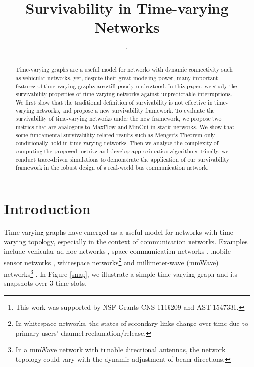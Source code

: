 \documentclass[10pt, conference, letterpaper]{IEEEtran}
\begin{document}
\title{Survivability in Time-varying Networks}
\author{
\thanks{This work was supported by NSF Grants CNS-1116209 and AST-1547331.}
}

\maketitle


\begin{abstract}
Time-varying graphs are a useful model for networks with dynamic connectivity such as vehicular networks, yet, despite their great modeling power, many important features of time-varying graphs are still poorly understood. In this paper, we study the survivability properties of time-varying networks against unpredictable interruptions. We first show that the traditional definition of survivability is not effective in time-varying networks, and propose a new survivability framework. To evaluate the survivability of time-varying networks under the new framework, we propose two metrics that are analogous to MaxFlow and MinCut in static networks. We show that some fundamental survivability-related results such as Menger's Theorem only conditionally hold in time-varying networks. Then we analyze the complexity of computing the proposed metrics and develop approximation algorithms. Finally, we conduct trace-driven simulations to demonstrate the application of our survivability framework in the robust design of a real-world bus communication network.
\end{abstract}

\section{Introduction}
Time-varying graphs have emerged as a useful model for networks with time-varying topology, especially in the context of communication networks. Examples include vehicular ad hoc networks \cite{vehicular, trace}, space communication networks \cite{space1,space2}, mobile sensor networks \cite{mobile-sensor1,mobile-sensor2}, whitespace networks\footnote{In whitespace networks, the states of secondary links change over time due to primary users' channel reclamation/release.} \cite{whitespace1,whitespace2,whitespace3} and millimeter-wave (mmWave) networks\footnote{In a mmWave network with tunable directional antennas, the network topology could vary with the dynamic adjustment of beam directions.} \cite{mmWave}. In Figure \ref{snap}, we illustrate a simple time-varying graph and its snapshots over 3 time slots.
\end{document}

